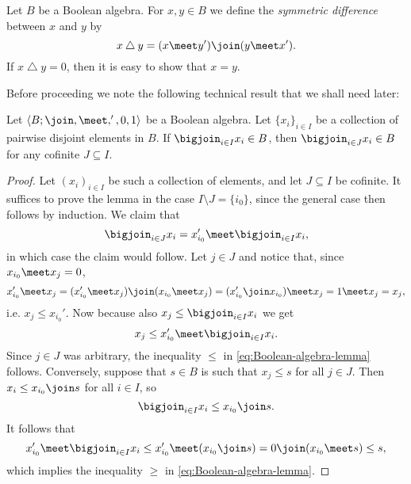 \documentclass[article, a4paper, 11pt, oneside]{memoir}
\numberwithin{equation}{chapter}
\renewcommand{\symdiff}{\mathbin{\triangle}}
\begin{document}
Let $B$ be a Boolean algebra. For $x,y \in B$ we define the \emph{symmetric difference} between $x$ and $y$ by
%
\begin{equation*}
    x \symdiff y
        = (x \meet y') \join (y \meet x').
\end{equation*}
%
If $x \symdiff y = 0$, then it is easy to show that $x = y$.

Before proceeding we note the following technical result that we shall need later:

\begin{lemma}
    \label{thm:refine_join}
    Let $\langle B; \join, \meet, ', 0, 1 \rangle$ be a Boolean algebra. Let $\{x_i\}_{i \in I}$ be a collection of pairwise disjoint elements in $B$. If $\bigjoin_{i \in I} x_i \in B$, then $\bigjoin_{i \in J} x_i \in B$ for any cofinite\footnotemark{} $J \subseteq I$.
\end{lemma}

\begin{proof}
    Let $(x_i)_{i \in I}$ be such a collection of elements, and let $J \subseteq I$ be cofinite. It suffices to prove the lemma in the case $I \setminus J = \{i_0\}$, since the general case then follows by induction. We claim that
    \begin{equation}
        \label{eq:Boolean-algebra-lemma}
        \bigjoin_{i \in J} x_i
            = x_{i_0}' \meet \bigjoin_{i \in I} x_i,
    \end{equation}
    in which case the claim would follow. Let $j \in J$ and notice that, since $x_{i_0} \meet x_j = 0$,
    \begin{equation*}
        x_{i_0}' \meet x_j
            = (x_{i_0}' \meet x_j) \join (x_{i_0} \meet x_j)
            = (x_{i_0}' \join x_{i_0}) \meet x_j
            = 1 \meet x_j
            = x_j,
    \end{equation*}
    i.e. $x_j \leq x_{i_0}'$. Now because also $x_j \leq \bigjoin_{i \in I} x_i$ we get
    \begin{equation*}
        x_j
            \leq x_{i_0}' \meet \bigjoin_{i \in I} x_i.
    \end{equation*}
    Since $j \in J$ was arbitrary, the inequality $\leq$ in \cref{eq:Boolean-algebra-lemma} follows. Conversely, suppose that $s \in B$ is such that $x_j \leq s$ for all $j \in J$. Then $x_i \leq x_{i_0} \join s$ for all $i \in I$, so
    \begin{equation*}
        \bigjoin_{i \in I} x_i
            \leq x_{i_0} \join s.
    \end{equation*}
    It follows that
    \begin{equation*}
        x_{i_0}' \meet \bigjoin_{i \in I} x_i
            \leq x_{i_0}' \meet (x_{i_0} \join s)
            = 0 \join (x_{i_0} \meet s)
            \leq s,
    \end{equation*}
    which implies the inequality $\geq$ in \cref{eq:Boolean-algebra-lemma}.
\end{proof}
\end{document}
